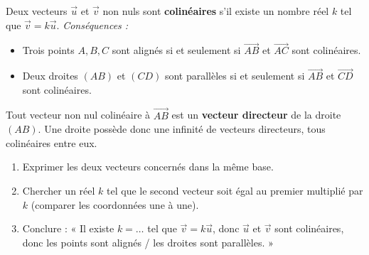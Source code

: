 \documentclass[11pt]{article}
\begin{document}
\begin{propriete}
Deux vecteurs $\vec{u}$ et $\vec{v}$ non nuls sont \textbf{colinéaires} s'il existe un nombre réel $k$ tel que $\vec{v} = k\vec{u}$.
\emph{Conséquences :}
\begin{itemize}
    \item Trois points $A, B, C$ sont alignés si et seulement si $\overrightarrow{AB}$ et $\overrightarrow{AC}$ sont colinéaires.
    \item Deux droites $(AB)$ et $(CD)$ sont parallèles si et seulement si $\overrightarrow{AB}$ et $\overrightarrow{CD}$ sont colinéaires.
\end{itemize}
\end{propriete}

\begin{definition}
Tout vecteur non nul colinéaire à $\overrightarrow{AB}$ est un \textbf{vecteur directeur} de la droite $(AB)$. Une droite possède donc une infinité de vecteurs directeurs, tous colinéaires entre eux.
\end{definition}

\begin{methode}
\begin{enumerate}
    \item Exprimer les deux vecteurs concernés dans la même base.
    \item Chercher un réel $k$ tel que le second vecteur soit égal au premier multiplié par $k$ (comparer les coordonnées une à une).
    \item Conclure : « Il existe $k = \dots$ tel que $\vec{v} = k\vec{u}$, donc $\vec{u}$ et $\vec{v}$ sont colinéaires, donc les points sont alignés / les droites sont parallèles. »
\end{enumerate}
\end{methode}
\end{document}
